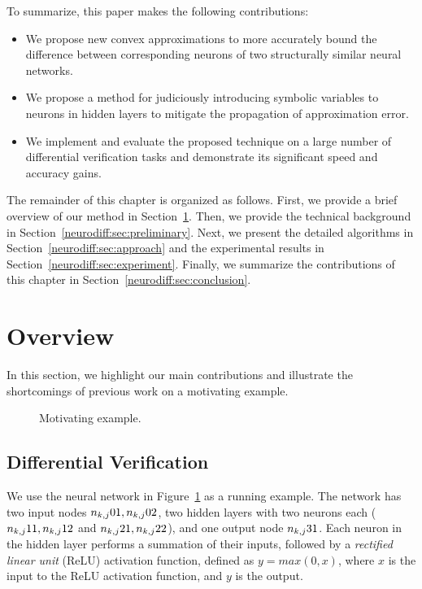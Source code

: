 To summarize, this paper makes the following contributions:
\begin{itemize}
\item
We propose new convex approximations to more accurately bound the
difference between corresponding neurons of two structurally similar
neural networks.
\item
We propose a method for judiciously introducing symbolic variables to
neurons in hidden layers to mitigate the propagation of approximation
error.
\item
We implement and evaluate the proposed technique on a large number of
differential verification tasks and demonstrate its significant speed
and accuracy gains.
\end{itemize}


The remainder of this chapter is organized as follows.  First, we
provide a brief overview of our method in Section~\ref{neurodiff:sec:overview}.
Then, we provide the technical background in
Section~\ref{neurodiff:sec:preliminary}.  Next, we present the detailed
algorithms in Section~\ref{neurodiff:sec:approach} and the experimental results
in Section~\ref{neurodiff:sec:experiment}. Finally, we summarize the contributions
of this chapter in Section~\ref{neurodiff:sec:conclusion}.



\section{Overview}
\label{neurodiff:sec:overview}

In this section, we highlight our main contributions and illustrate
the shortcomings of previous work on a motivating example.


\begin{figure}
	\centering
\scalebox{1.25}{}
\caption{Motivating example.}
\label{neurodiff:fig:motex}
\end{figure}



\subsection{Differential Verification}

We use the neural network in Figure~\ref{neurodiff:fig:motex} as a running
example. The network has two input nodes $ n_{k,j}{0}{1}, n_{k,j}{0}{2} $, two
hidden layers with two neurons each ($ n_{k,j}{1}{1}, n_{k,j}{1}{2} $ and
$ n_{k,j}{2}{1}, n_{k,j}{2}{2}$), and one output node $ n_{k,j}{3}{1} $.  Each neuron
in the hidden layer performs a summation of their inputs, followed by
a \textit{rectified linear unit} (ReLU) activation function, defined
as $ y = max(0,x) $, where $ x $ is the input to the ReLU activation
function, and $ y $ is the output.

